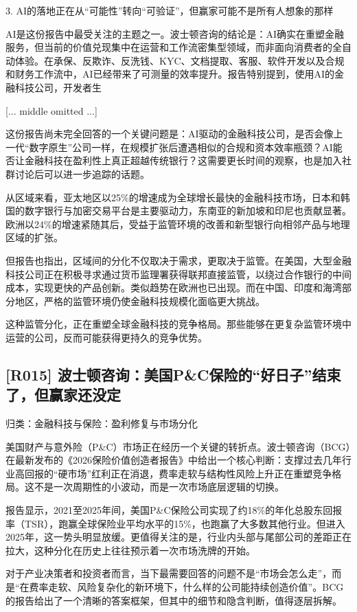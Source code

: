 \documentclass[11pt]{ctexart}
\begin{document}
3. AI的落地正在从“可能性”转向“可验证”，但赢家可能不是所有人想象的那样

AI是这份报告中最受关注的主题之一。波士顿咨询的结论是：AI确实在重塑金融服务，但当前的价值兑现集中在运营和工作流密集型领域，而非面向消费者的全自动体验。在承保、反欺诈、反洗钱、KYC、文档提取、客服、软件开发以及合规和财务工作流中，AI已经带来了可测量的效率提升。报告特别提到，使用AI的金融科技公司，开发者生

[... middle omitted ...]



这份报告尚未完全回答的一个关键问题是：AI驱动的金融科技公司，是否会像上一代“数字原生”公司一样，在规模扩张后遭遇相似的合规和资本效率瓶颈？AI能否让金融科技在盈利性上真正超越传统银行？这需要更长时间的观察，也是加入社群讨论后可以进一步追踪的话题。

从区域来看，亚太地区以25\%的增速成为全球增长最快的金融科技市场，日本和韩国的数字银行与加密交易平台是主要驱动力，东南亚的新加坡和印尼也贡献显著。欧洲以24\%的增速紧随其后，受益于监管环境的改善和新型银行向相邻产品与地理区域的扩张。

但报告也指出，区域间的分化不仅取决于需求，更取决于监管。在美国，大型金融科技公司正在积极寻求通过货币监理署获得联邦直接监管，以绕过合作银行的中间成本，实现更快的产品创新。类似趋势在欧洲也已出现。而在中国、印度和海湾部分地区，严格的监管环境仍使金融科技规模化面临更大挑战。

这种监管分化，正在重塑全球金融科技的竞争格局。那些能够在更复杂监管环境中运营的公司，反而可能获得更持久的竞争优势。

\subsection{[R015] 波士顿咨询：美国P\&C保险的“好日子”结束了，但赢家还没定}
{\small\color{refgray}归类：金融科技与保险：盈利修复与市场分化}

美国财产与意外险（P\&C）市场正在经历一个关键的转折点。波士顿咨询（BCG）在最新发布的《2026保险价值创造者报告》中给出一个核心判断：支撑过去几年行业高回报的“硬市场”红利正在消退，费率走软与结构性风险上升正在重塑竞争格局。这不是一次周期性的小波动，而是一次市场底层逻辑的切换。

报告显示，2021至2025年间，美国P\&C保险公司实现了约18\%的年化总股东回报率（TSR），跑赢全球保险业平均水平的15\%，也跑赢了大多数其他行业。但进入2025年，这一势头明显放缓。更值得关注的是，行业内头部与尾部公司的差距正在拉大，这种分化在历史上往往预示着一次市场洗牌的开始。

对于产业决策者和投资者而言，当下最需要回答的问题不是“市场会怎么走”，而是“在费率走软、风险复杂化的新环境下，什么样的公司能持续创造价值”。BCG的报告给出了一个清晰的答案框架，但其中的细节和隐含判断，值得逐层拆解。
\end{document}
